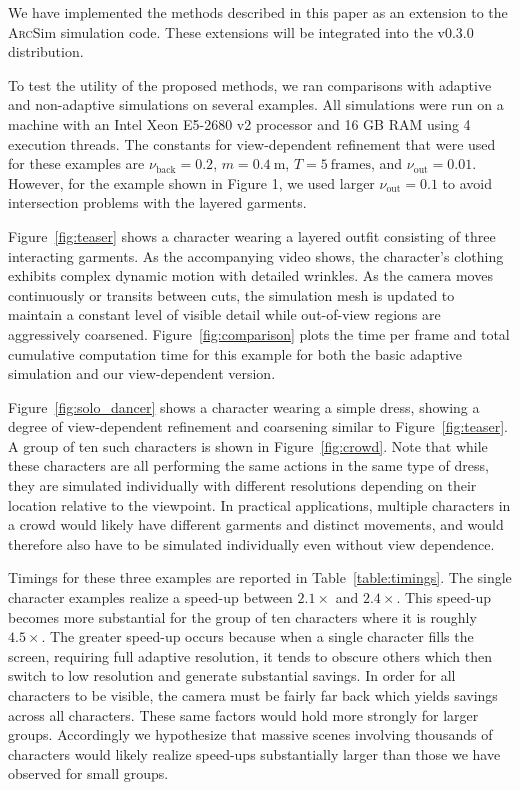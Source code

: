 \documentclass[10pt,journal,compsoc,twoside]{TexInputs/IEEEtran}
\newcommand{\arcsim}{\textsc{Arc}Sim\xspace}
\begin{document}
We have implemented the methods described in this paper as an extension to the
\arcsim simulation code.  
These extensions will be integrated into the v0.3.0 distribution.

To test the utility of the proposed methods, we ran comparisons with adaptive and
non-adaptive simulations on several
examples. All simulations were run on a machine with an Intel Xeon E5-2680 v2
processor and 16 GB RAM using 4 execution threads.
The constants for view-dependent refinement that were used for these examples are
$\nu_{\text{back}} = 0.2$, $m = 0.4\ \mathrm{m}$, $T = 5\ \mathrm{frames}$, and
$\nu_{\text{out}} = 0.01$.  However, for the example shown in Figure 1, we used larger
$\nu_{\text{out}} = 0.1$ to avoid intersection problems with the layered garments.

Figure~\ref{fig:teaser} shows a character wearing a layered outfit consisting
of three interacting garments. As the accompanying video shows, the
character's clothing exhibits complex dynamic motion with detailed wrinkles. As
the camera moves continuously or transits between cuts, the simulation mesh
is updated to maintain a constant level of visible detail while out-of-view
regions are aggressively coarsened. Figure~\ref{fig:comparison} plots the time
per frame and total cumulative computation time for this example for both the
basic adaptive simulation and our view-dependent version.

Figure~\ref{fig:solo_dancer} shows a character wearing a simple
dress, showing a degree of view-dependent refinement and coarsening similar to Figure~\ref{fig:teaser}.
A group of ten such characters is shown in
Figure~\ref{fig:crowd}. Note that while these characters are all
performing the same actions in the same type of dress, they are simulated individually
with different resolutions depending on their location relative to the viewpoint.
In practical applications, multiple characters in a crowd
would likely have different garments and distinct movements,
and would therefore 
also have to be simulated
individually even without view dependence.

Timings for these three examples are reported in Table~\ref{table:timings}. The single character examples
realize a speed-up between $2.1\times$ and $2.4\times$. This speed-up becomes
more substantial for the group of ten characters where it is roughly
$4.5\times$. The greater speed-up occurs because when a single character fills
the screen, requiring full adaptive resolution, it tends to obscure others
which then switch to low resolution and generate substantial savings. In order
for all characters to be visible, the camera must be fairly far back which
yields savings across all characters. These same factors would hold more
strongly for larger groups. Accordingly we hypothesize that massive scenes
involving thousands of characters would likely realize speed-ups substantially
larger than those we have observed for small groups.
\end{document}
